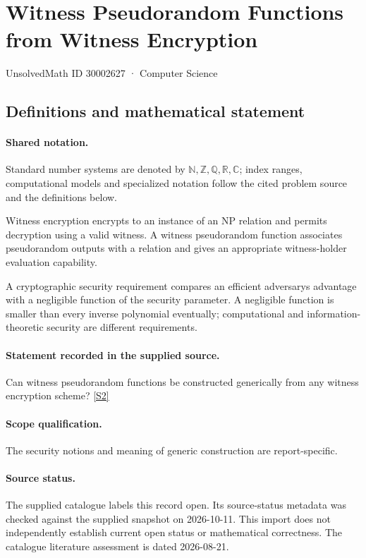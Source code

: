 \documentclass[11pt]{article}
\newcommand{\sref}[2]{\hyperlink{source:#1:#2}{[S#2]}}
\begin{document}
\setcounter{section}{30002626}
\section{Witness Pseudorandom Functions from Witness Encryption}\label{30002627}
{\small\sffamily UnsolvedMath ID 30002627 · Computer Science}
\subsection{Definitions and mathematical statement}

\paragraph{Shared notation.}Standard number systems are denoted by $\mathbb N,\mathbb Z,\mathbb Q,\mathbb R,\mathbb C$; index ranges, computational models and specialized notation follow the cited problem source and the definitions below.


Witness encryption encrypts to an instance of an NP relation and permits decryption using a valid witness. A witness pseudorandom function associates pseudorandom outputs with a relation and gives an appropriate witness-holder evaluation capability.

A cryptographic security requirement compares an efficient adversary\textquotesingle s advantage with a negligible function of the security parameter. A negligible function is smaller than every inverse polynomial eventually; computational and information-theoretic security are different requirements.
\paragraph{Statement recorded in the supplied source.}
Can witness pseudorandom functions be constructed generically from any witness encryption scheme? \sref{30002627}{2}
\paragraph{Scope qualification.}
The security notions and meaning of generic construction are report-specific.
\paragraph{Source status.}
The supplied catalogue labels this record open. Its source-status metadata was checked against the supplied snapshot on 2026-10-11. This import does not independently establish current open status or mathematical correctness. The catalogue literature assessment is dated 2026-08-21.
\end{document}
